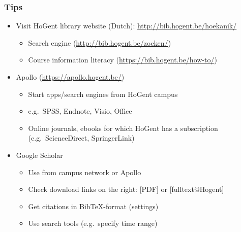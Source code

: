 \documentclass{beamer}
\begin{document}
\begin{frame}
  \frametitle{Tips}

  \begin{itemize}
    \item<+-> Visit HoGent library website (Dutch): \url{http://bib.hogent.be/hoekanik/}
      \begin{itemize}
        \item Search engine (\url{http://bib.hogent.be/zoeken/})
        \item Course information literacy (\url{https://bib.hogent.be/how-to/})
      \end{itemize}
    \item<+-> Apollo (\url{https://apollo.hogent.be/})
      \begin{itemize}
        \item Start apps/search engines from HoGent campus
        \item e.g.~SPSS, Endnote, Visio, Office
        \item Online journals, ebooks for which HoGent has a subscription (e.g.~ScienceDirect, SpringerLink)
      \end{itemize}
    \item<+-> Google Scholar
      \begin{itemize}
        \item Use from campus network or Apollo
        \item Check download links on the right: [PDF] or [fulltext@Hogent]
        \item Get citations in Bib{\TeX}-format (settings)
        \item Use search tools (e.g.~specify time range)
      \end{itemize}
  \end{itemize}
\end{frame}
\end{document}

